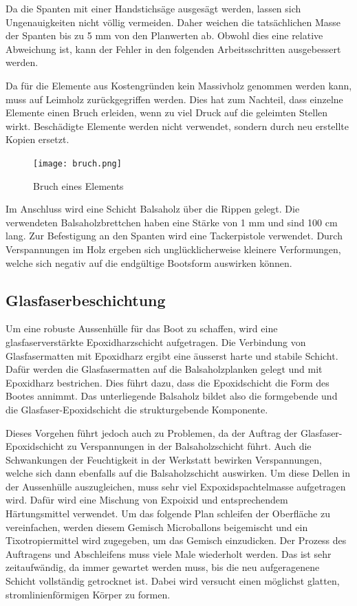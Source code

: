 Da die Spanten mit einer Handstichsäge ausgesägt werden, lassen sich Ungenauigkeiten nicht völlig vermeiden. Daher weichen die tatsächlichen Masse der Spanten bis zu 5 mm von den Planwerten ab. Obwohl dies eine relative Abweichung ist, kann der Fehler in den folgenden Arbeitsschritten ausgebessert werden. 

Da für die Elemente aus Kostengründen kein Massivholz genommen werden kann, muss auf Leimholz zurückgegriffen werden. Dies hat zum Nachteil, dass einzelne Elemente einen Bruch erleiden, wenn zu viel Druck auf die geleimten Stellen wirkt. Beschädigte Elemente werden nicht verwendet, sondern durch neu erstellte Kopien ersetzt. 
\begin{figure}[H]
    \centering
    \texttt{[image: bruch.png]}
    \caption{Bruch eines Elements}
    \label{fig:bruch}
\end{figure}

Im Anschluss wird eine Schicht Balsaholz über die Rippen gelegt. Die verwendeten Balsaholzbrettchen haben eine Stärke von 1 mm und sind 100 cm lang. Zur Befestigung an den Spanten wird eine Tackerpistole verwendet. Durch Verspannungen im Holz ergeben sich unglücklicherweise kleinere Verformungen, welche sich negativ auf die endgültige Bootsform auswirken können.

\subsection{Glasfaserbeschichtung}
Um eine robuste Aussenhülle für das Boot zu schaffen, wird eine glasfaserverstärkte Epoxidharzschicht aufgetragen. Die Verbindung von Glasfasermatten mit Epoxidharz ergibt eine äusserst harte und stabile Schicht.  Dafür  werden die Glasfasermatten auf die Balsaholzplanken gelegt und mit Epoxidharz bestrichen. Dies führt dazu, dass die Epoxidschicht die Form des Bootes annimmt. Das unterliegende Balsaholz bildet also die formgebende und die Glasfaser-Epoxidschicht die strukturgebende Komponente. 

Dieses Vorgehen führt jedoch auch zu Problemen, da der Auftrag der Glasfaser-Epoxidschicht zu Verspannungen in der Balsaholzschicht führt. Auch die Schwankungen der Feuchtigkeit in der Werkstatt bewirken Verspannungen, welche sich dann ebenfalls auf die Balsaholzschicht auswirken.  Um diese Dellen in der Aussenhülle auszugleichen, muss sehr viel Expoxidspachtelmasse aufgetragen wird. Dafür wird eine Mischung von Expoixid und entsprechendem Härtungsmittel verwendet.  Um das folgende Plan schleifen der Oberfläche zu vereinfachen, werden diesem Gemisch Microballons beigemischt und ein Tixotropiermittel wird zugegeben, um das Gemisch einzudicken. Der Prozess des Auftragens und Abschleifens muss viele Male wiederholt werden. Das ist sehr zeitaufwändig, da immer gewartet werden muss, bis die neu aufgeragenene Schicht vollständig getrocknet ist.  Dabei wird versucht einen möglichst glatten, stromlinienförmigen Körper zu formen.


